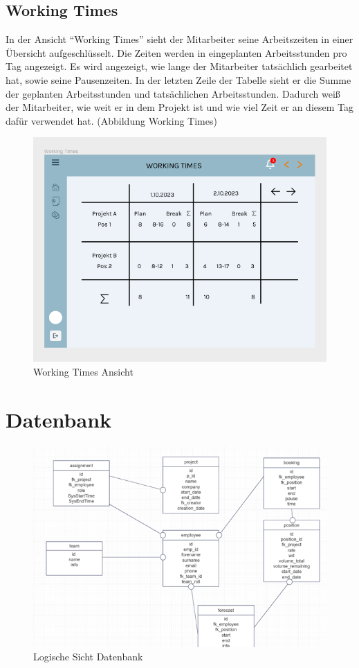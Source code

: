 \documentclass{article}
\begin{document}
\subsection{Working Times}
In der Ansicht “Working Times” sieht der Mitarbeiter seine Arbeitszeiten in
einer Übersicht aufgeschlüsselt. Die Zeiten werden in eingeplanten
Arbeitsstunden pro Tag angezeigt. Es wird angezeigt, wie lange der Mitarbeiter
tatsächlich gearbeitet hat, sowie seine Pausenzeiten. In der letzten Zeile der
Tabelle sieht er die Summe der geplanten Arbeitsstunden und tatsächlichen
Arbeitsstunden. Dadurch weiß der Mitarbeiter, wie weit er in dem Projekt ist
und wie viel Zeit er an diesem Tag dafür verwendet hat. (Abbildung Working
Times)

\begin{figure}[]
    \includegraphics[height= 0.5\textwidth,width= \textwidth]{images/Working Times.png}
    \caption{Working Times Ansicht}
    \label{fig:beispiel}
\end{figure}
\clearpage
\newpage

\section{Datenbank}

\begin{figure}[h]
    \centering
    \includegraphics[width= \textwidth]{images/logischeAnsicht.png}
    \caption{Logische Sicht Datenbank}
    \label{fig:beispiel}
\end{figure}
\end{document}
